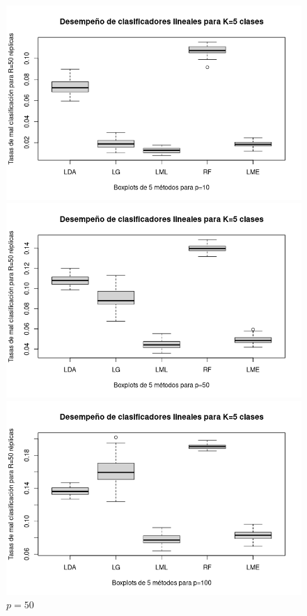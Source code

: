 \documentclass{report}
\begin{document}
  \begin{figure} [h]
  	\begin{multicols}{2}
  		\includegraphics[width=\linewidth]{5_clases_p10_sigma_II}\par 
  		\caption*{$p=10$}
  		\includegraphics[width=\linewidth]{5_clases_p50_sigma_II}\par 
  		\caption*{$p=50$}	 
  	\end{multicols}
  	\begin{multicols}{2}
  		\includegraphics[width=\linewidth]{5_clases_p100_sigma_II}\par

\end{multicols}
\end{figure}
\end{document}
